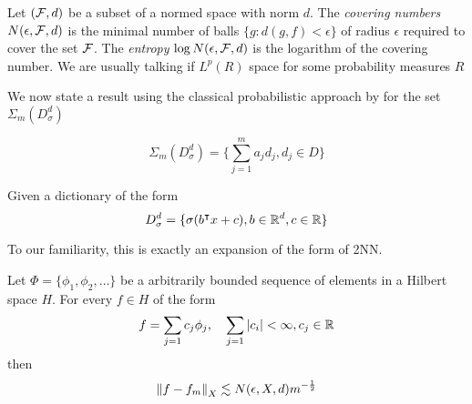 \begin{definition}
    \label{def:covering_num}
    Let $(\mathcal{F}, d)$ be a subset of a normed space with norm $d$. The
    \textit{covering numbers} $N(\epsilon, \mathcal{F}, d)$ is the minimal number
    of balls $\{g: d(g, f) < \epsilon\}$ of radius $\epsilon$ required to cover
    the set $\mathcal{F}$. The \textit{entropy} $\log N(\epsilon, \mathcal{F}, d)$ is
    the logarithm of the covering number. We are usually talking if $L^p(R)$ space
    for some probability measures $R$
\end{definition}


We now state a result using the classical probabilistic approach by
\cite{pisierRemarquesResultatNon1980} for the set $\Sigma_m(D_{\sigma}^d)$

\begin{equation}
    \Sigma_m(D_{\sigma}^d) = \{\sum_{j=1}^m a_j d_j, d_j \in D\}
\end{equation}

Given a dictionary of the form
\begin{equation}
    D_{\sigma}^d = \{\sigma(b{}^{\intercal} x + c), b \in \mathbb{R}^d, c \in \mathbb{R}\}
\end{equation}

To our familiarity, this is exactly an expansion of the form of 2NN.

\begin{theorem}
    \label{thm:maurey}
    Let $\Phi = \{\phi_1, \phi_2, \dots\}$ be a arbitrarily bounded sequence of
    elements in a Hilbert space $H$. For every $f \in H$ of the form
    \begin{equation}
        f = \sum_{j=1} c_j \phi_j, \quad
            \sum_{j=1} \left| c_i \right| < \infty, c_j \in \mathbb{R} 
    \end{equation}
    then
    \begin{equation}
        \left\| f - f_m \right\|_{X} \lesssim N(\epsilon, X, d) m^{-\frac{1}{2}} 
    \end{equation}
\end{theorem}


